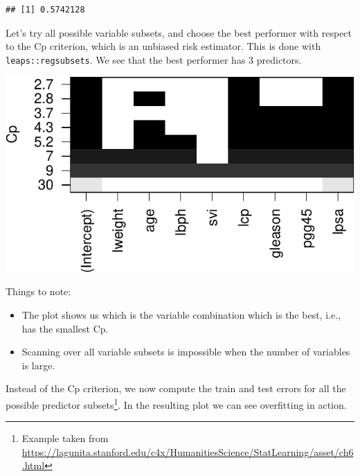 \documentclass[]{book}
\newenvironment{Shaded}{\begin{snugshade}}{\end{snugshade}}
\newcommand{\KeywordTok}[1]{\textcolor[rgb]{0.13,0.29,0.53}{\textbf{#1}}}
\newcommand{\DataTypeTok}[1]{\textcolor[rgb]{0.13,0.29,0.53}{#1}}
\newcommand{\StringTok}[1]{\textcolor[rgb]{0.31,0.60,0.02}{#1}}
\newcommand{\CommentTok}[1]{\textcolor[rgb]{0.56,0.35,0.01}{\textit{#1}}}
\newcommand{\OperatorTok}[1]{\textcolor[rgb]{0.81,0.36,0.00}{\textbf{#1}}}
\newcommand{\NormalTok}[1]{#1}
\providecommand{\tightlist}{%
  \setlength{\itemsep}{0pt}\setlength{\parskip}{0pt}}
\theoremstyle{definition}
\theoremstyle{definition}
\theoremstyle{definition}
\theoremstyle{remark}
\begin{document}
\begin{verbatim}
## [1] 0.5742128
\end{verbatim}

Let's try all possible variable subsets, and choose the best performer
with respect to the Cp criterion, which is an unbiased risk estimator.
This is done with \texttt{leaps::regsubsets}. We see that the best
performer has 3 predictors.

\begin{Shaded}
\end{Shaded}

\includegraphics[width=0.5\linewidth]{Rcourse_files/figure-latex/all subset-1}

Things to note:

\begin{itemize}
\tightlist
\item
  The plot shows us which is the variable combination which is the best,
  i.e., has the smallest Cp.
\item
  Scanning over all variable subsets is impossible when the number of
  variables is large.
\end{itemize}

Instead of the Cp criterion, we now compute the train and test errors
for all the possible predictor subsets\footnote{Example taken from
  \url{https://lagunita.stanford.edu/c4x/HumanitiesScience/StatLearning/asset/ch6.html}}.
In the resulting plot we can see overfitting in action.
\end{document}
